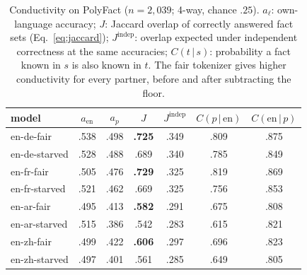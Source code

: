 \begin{table}[t]
\centering
\small
\begin{tabular}{l cc cc cc}
\toprule
model & $a_{\mathrm{en}}$ & $a_{p}$ & $J$ & $J^{\mathrm{indep}}$ & $C(p\,|\,\mathrm{en})$ & $C(\mathrm{en}\,|\,p)$ \\
\midrule
en-de-fair    & .538 & .498 & \textbf{.725} & .349 & .809 & .875 \\
en-de-starved & .528 & .488 & .689 & .340 & .785 & .849 \\
en-fr-fair    & .505 & .476 & \textbf{.729} & .325 & .819 & .869 \\
en-fr-starved & .521 & .462 & .669 & .325 & .756 & .853 \\
en-ar-fair    & .495 & .413 & \textbf{.582} & .291 & .675 & .808 \\
en-ar-starved & .515 & .386 & .542 & .283 & .615 & .821 \\
en-zh-fair    & .499 & .422 & \textbf{.606} & .297 & .696 & .823 \\
en-zh-starved & .497 & .401 & .561 & .285 & .649 & .805 \\
\bottomrule
\end{tabular}
\caption{Conductivity on PolyFact ($n=2{,}039$; 4-way, chance $.25$).
$a_\ell$: own-language accuracy; $J$: Jaccard overlap of correctly answered
fact sets (Eq.~\ref{eq:jaccard}); $J^{\mathrm{indep}}$: overlap expected under
independent correctness at the same accuracies; $C(t\,|\,s)$: probability a
fact known in $s$ is also known in $t$. The fair tokenizer gives higher
conductivity for every partner, before and after subtracting the floor.}
\label{tab:conductivity}
\end{table}

